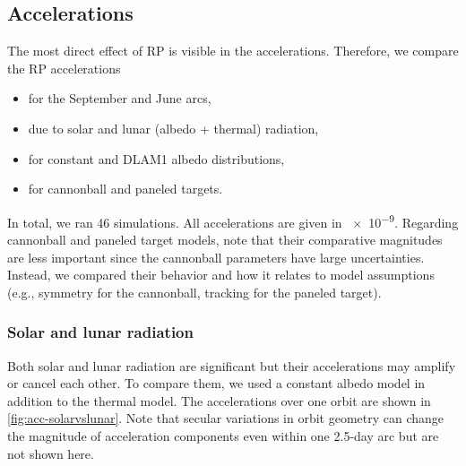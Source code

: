 \subsection{Accelerations}
The most direct effect of \gls{RP} is visible in the accelerations. Therefore, we compare the \gls{RP} accelerations
\begin{itemize}
    \item for the September and June arcs,
    \item due to solar and lunar (albedo + thermal) radiation,
    \item for constant and \gls{DLAM1} albedo distributions,
    \item for cannonball and paneled targets.
\end{itemize}
In total, we ran 46 simulations. All accelerations are given in \qty{e-9}{\acc}. Regarding cannonball and paneled target models, note that their comparative magnitudes are less important since the cannonball parameters have large uncertainties. Instead, we compared their behavior and how it relates to model assumptions (e.g., symmetry for the cannonball, tracking for the paneled target).


\subsubsection{Solar and lunar radiation}
Both solar and lunar radiation are significant but their accelerations may amplify or cancel each other. To compare them, we used a constant albedo model in addition to the thermal model. The accelerations over one orbit are shown in \cref{fig:acc-solarvslunar}. Note that secular variations in orbit geometry can change the magnitude of acceleration components even within one 2.5-day arc but are not shown here.

